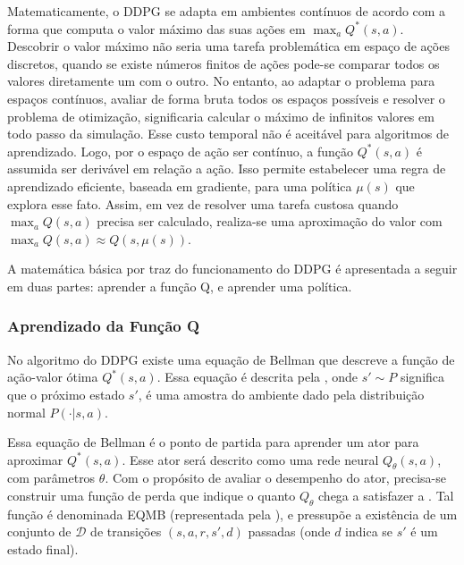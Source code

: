 Matematicamente, o \acrshort{DDPG} se adapta em ambientes contínuos de acordo com a forma que computa o valor máximo das suas ações em $\max_a Q^*(s,a)$. Descobrir o valor máximo não seria uma tarefa problemática em espaço de ações discretos, quando se existe números finitos de ações pode-se comparar todos os valores diretamente um com o outro. No entanto, ao adaptar o problema para espaços contínuos, avaliar de forma bruta todos os espaços possíveis e resolver o problema de otimização, significaria calcular o máximo de infinitos valores em todo passo da simulação. Esse custo temporal não é aceitável para algoritmos de aprendizado. Logo, por o espaço de ação ser contínuo, a função $Q^*(s,a)$ é assumida ser derivável em relação a ação. Isso permite estabelecer uma regra de aprendizado eficiente, baseada em gradiente, para uma política $\mu(s)$ que explora esse fato. Assim, em vez de resolver uma tarefa custosa quando $\max_a Q(s,a)$ precisa ser calculado, realiza-se uma aproximação do valor com $\max_a Q(s,a) \approx Q(s,\mu(s))$.

A matemática básica por traz do funcionamento do \acrshort{DDPG} é apresentada a seguir em duas partes: aprender a função Q, e aprender uma política.

\subsubsection{Aprendizado da Função Q}

No algoritmo do \acrshort{DDPG} existe uma equação de Bellman que descreve a função de ação-valor ótima $Q^*(s,a)$. Essa equação é descrita pela , onde $s' \sim P$ significa que o próximo estado $s'$, é uma amostra do ambiente dado pela distribuição normal $P(\cdot| s,a)$.


Essa equação de Bellman é o ponto de partida para aprender um ator para aproximar $Q^*(s,a)$. Esse ator será descrito como uma rede neural $Q_{\theta}(s,a)$, com parâmetros $\theta$. Com o propósito de avaliar o desempenho do ator, precisa-se construir uma função de perda que indique o quanto $Q_{\theta}$ chega a satisfazer a . Tal função é denominada \acrfull{EQMB} (representada pela ), e pressupõe a existência de um conjunto de ${\mathcal D}$ de transições $(s,a,r,s',d)$ passadas (onde $d$ indica se $s'$ é um estado final). 

